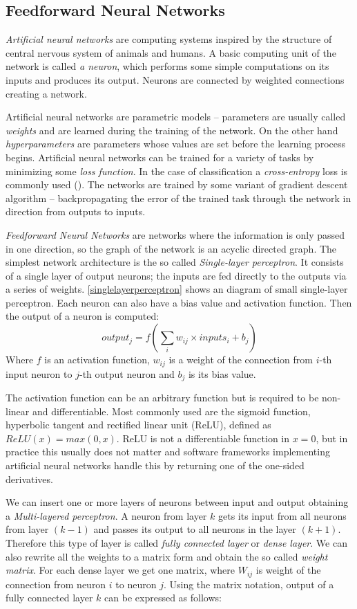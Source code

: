 \subsection{Feedforward Neural Networks}
\textit{Artificial neural networks} are computing systems inspired by the structure of central nervous system of animals and humans. A basic computing unit of the network is called \textit{a neuron}, which performs some simple computations on its inputs and produces its output. Neurons are connected by weighted connections creating a network. \par
Artificial neural networks are parametric models -- parameters are usually called \textit{weights} and are learned during the training of the network. On the other hand \textit{hyperparameters} are parameters whose values are set before the learning process begins. Artificial neural networks can be trained for a variety of tasks by minimizing some \textit{loss function}. In the case of classification a \textit{cross-entropy} loss is commonly used (\cite{goodfellow_deep_2016}). The networks are trained by some variant of gradient descent algorithm -- backpropagating the error of the trained task through the network in direction from outputs to inputs. \par
\textit{Feedforward Neural Networks} are networks where the information is only passed in one direction, so the graph of the network is an acyclic directed graph. The simplest network architecture is the so called \textit{Single-layer perceptron}. It consists of a single layer of output neurons; the inputs are fed directly to the outputs via a series of weights. \autoref{singlelayerperceptron} shows an diagram of small single-layer perceptron. Each neuron can also have a bias value and activation function. Then the output of a neuron is computed: $$output_j = f(\sum_{i} {w_{ij}\times inputs_i + b_j})$$ Where $f$ is an activation function, $w_{ij}$ is a weight of the connection from $i$-th input neuron to $j$-th output neuron and $b_j$ is its bias value. 

The activation function can be an arbitrary function but is required to be non-linear and differentiable. Most commonly used are the sigmoid function, hyperbolic tangent and rectified linear unit (ReLU), defined as $ReLU(x) = max(0,x)$. ReLU is not a differentiable function in $x=0$, but in practice this usually does not matter and software frameworks implementing artificial neural networks handle this by returning one of the one-sided derivatives.\par  
We can insert one or more layers of neurons between input and output obtaining a \textit{Multi-layered perceptron}. A neuron from layer $k$ gets its input from all neurons from layer $(k-1)$ and passes its output to all neurons in the layer $(k+1)$. Therefore this type of layer is called \textit{fully connected layer} or \textit{dense layer}.  We can also rewrite all the weights to a matrix form and obtain the so called \textit{weight matrix}. For each dense layer we get one matrix, where $W_{ij}$ is weight of the connection from neuron $i$ to neuron $j$. Using the matrix notation, output of a fully connected layer $k$ can be expressed as follows: 
